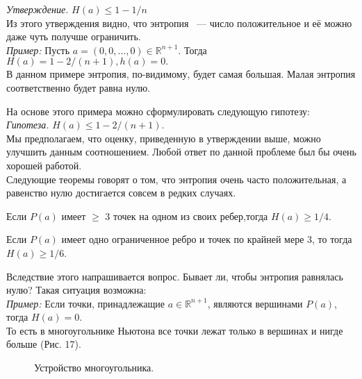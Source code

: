 \documentclass[russian]{lecture-notes}
\begin{document}
\emph{Утверждение.} $H(a) \le 1 - 1/n$\\

Из этого утверждения видно, что энтропия ~--- число положительное и её можно даже чуть получше ограничить.\\

\emph{Пример:}
Пусть $a = (0,0,\ldots,0) \in \mathbb{R}^{n+1}.$ Тогда $H(a) = 1 - 2/(n+1), h(a) = 0.$ \\

В данном примере энтропия, по-видимому, будет самая большая. Малая энтропия соответственно будет равна нулю.

На основе этого примера можно сформулировать следующую гипотезу:\\

\emph{ Гипотеза.}  $H(a) \le 1 - 2/(n+1).$\\

Мы предполагаем, что оценку, приведенную в утверждении выше, можно улучшить данным соотношением. Любой ответ по данной проблеме был бы очень хорошей работой.\\

Следующие теоремы говорят о том, что энтропия очень часто положительная, а равенство нулю достигается совсем в редких случаях.\\
\begin{Theorem}
	Если $P(a)$ имеет $\ge$ 3 точек на одном из своих ребер,тогда $H(a) \ge 1/4$.
\end{Theorem}

\begin{Theorem}
 Если $P(a)$ имеет одно ограниченное ребро и точек по крайней мере 3, то тогда $H(a) \ge 1/6$.\\
\end{Theorem}



Вследствие этого напрашивается вопрос. Бывает ли, чтобы энтропия равнялась нулю? Такая ситуация возможна:\\

\emph{Пример:}
Если точки, принадлежащие $a \in \mathbb{R}^{n+1}$, являются вершинами $P(a)$, тогда $H(a) = 0$.\\

То есть в многоугольнике Ньютона все точки лежат только в вершинах и нигде больше (Рис. 17).

\begin{figure}[h]
\caption{Устройство многоугольника.}
\end{figure}
\end{document}
